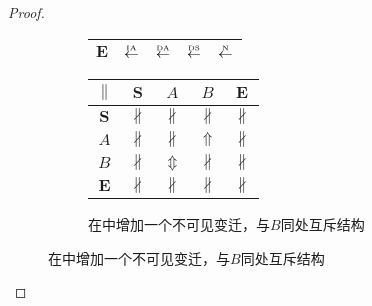 \begin{proof}
\begin{figure}[htbp]
\begin{subfigure}{1\textwidth}
\begin{minipage}[b]{0.3\textwidth}
\begin{tabular}{|c|c|c|c|c|}
        $\bm{E}$ & $\overset{\text{\tiny{IA}}}{\leftarrow}$ & $\overset{\text{\tiny{DA}}}{\leftarrow}$ & $\overset{\text{\tiny{DS}}}{\leftarrow}$ & $\overset{\text{\tiny{N}}}{\leftarrow}$\\ \hline
      \end{tabular}
    \end{minipage}
    \begin{minipage}[b]{0.3\textwidth}
      \vspace{1em}
      \centering
      \begin{tabular}{|c|c|c|c|c|} \hline
        $\parallel$ & $\bm{S}$ & $A$ & $B$ & $\bm{E}$\\ \hline
        $\bm{S}$ & $\nparallel$ & $\nparallel$ & $\nparallel$ & $\nparallel$\\ \hline
        $A$ & $\nparallel$ & $\nparallel$ & $\Uparrow$ & $\nparallel$\\ \hline
        $B$ & $\nparallel$ & $\Updownarrow$ & $\nparallel$ & $\nparallel$\\ \hline
        $\bm{E}$ & $\nparallel$ & $\nparallel$ & $\nparallel$ & $\nparallel$\\ \hline
      \end{tabular}
    \end{minipage}
    \caption{在中增加一个不可见变迁，与$B$同处互斥结构}
    \label{fig:uniqueness_3_f}
  \end{subfigure}


\end{figure}
\end{proof}
